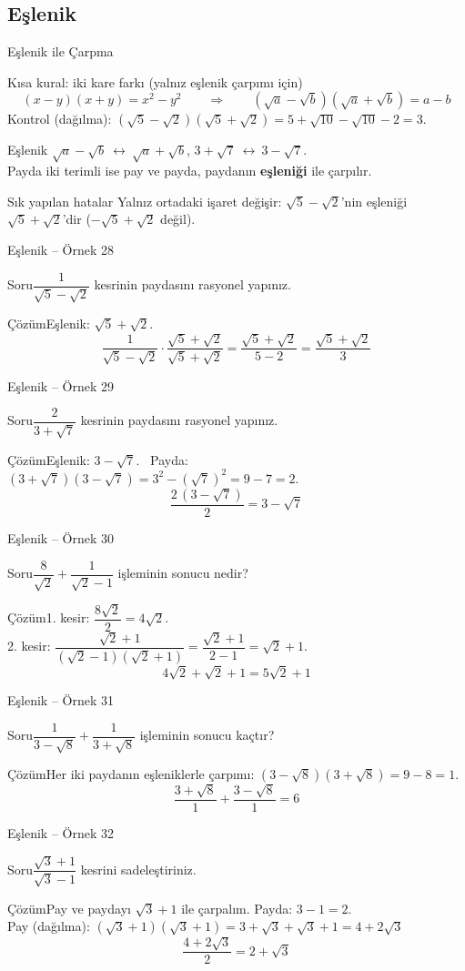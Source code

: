 \documentclass[aspectratio=169,11pt,handout]{beamer}
\newcommand{\soru}[3]{%
\begin{frame}{#1}
  \begin{block}{Soru}\large #2\end{block}
  \pause
  \begin{exampleblock}{Çözüm}\large #3\end{exampleblock}
\end{frame}}
\begin{document}
\subsection{Eşlenik}
\begin{frame}{Eşlenik ile Çarpma}
\begin{block}{Kısa kural: iki kare farkı (yalnız eşlenik çarpımı için)}
\[(x-y)(x+y)=x^2-y^2\qquad\Rightarrow\qquad (\sqrt a-\sqrt b)(\sqrt a+\sqrt b)=a-b\]
Kontrol (dağılma): \((\sqrt5-\sqrt2)(\sqrt5+\sqrt2)=5+\sqrt{10}-\sqrt{10}-2=3\).
\end{block}
\begin{block}{Eşlenik}
\(\sqrt a-\sqrt b\ \leftrightarrow\ \sqrt a+\sqrt b\), \qquad \(3+\sqrt7\ \leftrightarrow\ 3-\sqrt7\).\\
Payda iki terimli ise pay ve payda, paydanın \textbf{eşleniği} ile çarpılır.
\end{block}
\begin{alertblock}{Sık yapılan hatalar}
Yalnız ortadaki işaret değişir: \(\sqrt5-\sqrt2\)'nin eşleniği \(\sqrt5+\sqrt2\)'dir (\(-\sqrt5+\sqrt2\) değil).
\end{alertblock}
\end{frame}

\soru{Eşlenik -- Örnek 28}
{\(\dfrac{1}{\sqrt5-\sqrt2}\) kesrinin paydasını rasyonel yapınız.}
{Eşlenik: \(\sqrt5+\sqrt2\).
\[\frac{1}{\sqrt5-\sqrt2}\cdot\frac{\sqrt5+\sqrt2}{\sqrt5+\sqrt2}=\frac{\sqrt5+\sqrt2}{5-2}=\frac{\sqrt5+\sqrt2}{3}\]}

\soru{Eşlenik -- Örnek 29}
{\(\dfrac{2}{3+\sqrt7}\) kesrinin paydasını rasyonel yapınız.}
{Eşlenik: \(3-\sqrt7\). \ Payda: \((3+\sqrt7)(3-\sqrt7)=3^2-(\sqrt7)^2=9-7=2\).
\[\frac{2\,(3-\sqrt7)}{2}=3-\sqrt7\]}

\soru{Eşlenik -- Örnek 30}
{\(\dfrac{8}{\sqrt2}+\dfrac{1}{\sqrt2-1}\) işleminin sonucu nedir?}
{1. kesir: \(\dfrac{8\sqrt2}{2}=4\sqrt2\).\\[3pt]
2. kesir: \(\dfrac{\sqrt2+1}{(\sqrt2-1)(\sqrt2+1)}=\dfrac{\sqrt2+1}{2-1}=\sqrt2+1\).
\[4\sqrt2+\sqrt2+1=5\sqrt2+1\]}

\soru{Eşlenik -- Örnek 31}
{\(\dfrac{1}{3-\sqrt8}+\dfrac{1}{3+\sqrt8}\) işleminin sonucu kaçtır?}
{Her iki paydanın eşleniklerle çarpımı: \((3-\sqrt8)(3+\sqrt8)=9-8=1\).
\[\frac{3+\sqrt8}{1}+\frac{3-\sqrt8}{1}=6\]}

\soru{Eşlenik -- Örnek 32}
{\(\dfrac{\sqrt3+1}{\sqrt3-1}\) kesrini sadeleştiriniz.}
{Pay ve paydayı \(\sqrt3+1\) ile çarpalım. Payda: \(3-1=2\).\\[3pt]
Pay (dağılma): \((\sqrt3+1)(\sqrt3+1)=3+\sqrt3+\sqrt3+1=4+2\sqrt3\)
\[\frac{4+2\sqrt3}{2}=2+\sqrt3\]}
\end{document}
